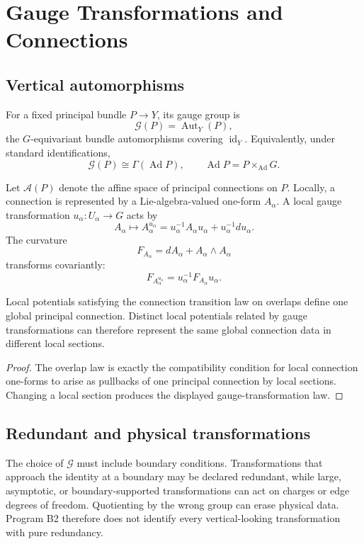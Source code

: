 \documentclass[11pt]{article}
\newcommand{\Aut}{\operatorname{Aut}}
\newcommand{\Ad}{\operatorname{Ad}}
\newcommand{\id}{\operatorname{id}}
\newcommand{\Conn}{\mathcal A}
\newcommand{\Gg}{\mathcal G}
\begin{document}
\section{Gauge Transformations and Connections}

\subsection{Vertical automorphisms}

For a fixed principal bundle $P\to Y$, its gauge group is
\[
 \Gg(P)=\Aut_Y(P),
\]
the $G$-equivariant bundle automorphisms covering $\id_Y$.  Equivalently,
under standard identifications,
\[
 \Gg(P)\cong\Gamma(\Ad P),
\qquad
\Ad P=P\times_{\Ad}G.
\]

Let $\Conn(P)$ denote the affine space of principal connections on $P$.
Locally, a connection is represented by a Lie-algebra-valued one-form
$A_\alpha$.  A local gauge transformation $u_\alpha:U_\alpha\to G$ acts by
\[
 A_\alpha\longmapsto A_\alpha^{u_\alpha}
 =u_\alpha^{-1}A_\alpha u_\alpha+u_\alpha^{-1}du_\alpha.
\]
The curvature
\[
 F_{A_\alpha}=dA_\alpha+A_\alpha\wedge A_\alpha
\]
transforms covariantly:
\[
 F_{A_\alpha^{u_\alpha}}
 =u_\alpha^{-1}F_{A_\alpha}u_\alpha.
\]

\begin{proposition}
\label{prop:global-connection}
Local potentials satisfying the connection transition law on overlaps define
one global principal connection.  Distinct local potentials related by gauge
transformations can therefore represent the same global connection data in
different local sections.
\end{proposition}

\begin{proof}
The overlap law is exactly the compatibility condition for local connection
one-forms to arise as pullbacks of one principal connection by local sections.
Changing a local section produces the displayed gauge-transformation law.
\end{proof}

\subsection{Redundant and physical transformations}

The choice of $\Gg$ must include boundary conditions.  Transformations that
approach the identity at a boundary may be declared redundant, while large,
asymptotic, or boundary-supported transformations can act on charges or edge
degrees of freedom.  Quotienting by the wrong group can erase physical data.
Program B2 therefore does not identify every vertical-looking transformation
with pure redundancy.
\end{document}
